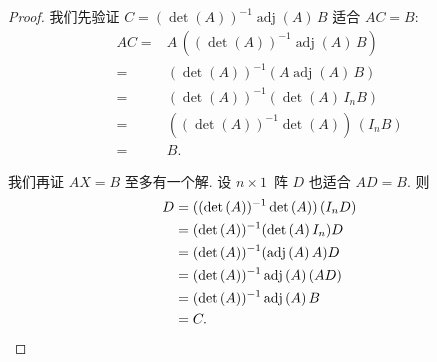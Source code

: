 \documentclass[../libro.tex]{subfiles}
\begin{document}
\begin{proof}
    我们先验证
    \(C = (\det {(A)})^{-1} \operatorname{adj} {(A)}\,B\)
    适合 \(AC = B\):
    \begin{align*}
        AC
        = {} & A\,
        ((\det {(A)})^{-1} \operatorname{adj} {(A)}\, B)
        \\
        = {} & (\det {(A)})^{-1} (A\operatorname{adj} {(A)}\, B)
        \\
        = {} & (\det {(A)})^{-1} (\det {(A)}\, I_n B)
        \\
        = {} & ((\det {(A)})^{-1} \det {(A)})\, (I_n B)
        \\
        = {} & B.
    \end{align*}

    我们再证 \(AX = B\) 至多有一个解.
    设 \(n \times 1\)~阵 \(D\) 也适合 \(AD = B\).
    则
    \begin{align*}
        D
        = {} & ((\det {(A)})^{-1} \det {(A)})\, (I_n D)
        \\
        = {} & (\det {(A)})^{-1} (\det {(A)}\, I_n) D
        \\
        = {} & (\det {(A)})^{-1} (\operatorname{adj} {(A)}\, A) D
        \\
        = {} & (\det {(A)})^{-1} \operatorname{adj} {(A)}\, (AD)
        \\
        = {} & (\det {(A)})^{-1} \operatorname{adj} {(A)}\,B
        \\
        = {} & C.
        \qedhere
    \end{align*}
\end{proof}
\end{document}
